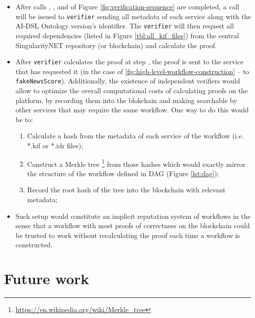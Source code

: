 \documentclass[]{report}
\begin{document}
\begin{enumerate}
\begin{itemize}
	\item After calls , ,  and  of 
	Figure \ref{fig:verification-sequence} are completed, a call  will be issued to
	 \texttt{verifier} sending all metadata of each  service along
	 with the AI-DSL Ontology version's identifier. The \texttt{verifier} will then 
	 request all required dependencies
	 (listed in Figure \ref{tbl:all_kif_files}) from the central SingularityNET repository 
	 (or blockchain) and calculate the proof.
	\item After \texttt{verifier} calculates the proof at step , 
	the proof is sent to the service that has requested it (in the case of
	\ref{fig:high-level-workflow-construction} -- to \texttt{fakeNewsScore}). 
	Additionally, the existence of independent verifiers would allow to optimize the overall computational 
	costs of calculating proofs on the platform, by recording them into the blokchain and making
	 searchable by other services that may require the same workflow. One way to do this would be to:
	\begin{enumerate}
		\item Calculate a hash from the metadata of each service of the workflow 
		(i.e. *.kif or *.idr files);
		\item Construct a Merkle tree
		\footnote{\href{https://en.wikipedia.org/wiki/Merkle_tree}{https://en.wikipedia.org/wiki/Merkle\_tree}} 
		from those hashes which would exactly mirror the structure of the workflow 
		defined in DAG (Figure \ref{lst:dag});
		\item Record the root hash of the tree into the blockchain with relevant metadata;
	\end{enumerate}

	 \item Such setup would constitute an implicit reputation system of workflows in the sense that
	 a workflow with most proofs of correctness on the blockchain could be trusted to work without
	 recalculating the proof each time a workflow is constructed.

\end{itemize}

\end{enumerate}

\section{Future work}
\end{document}
